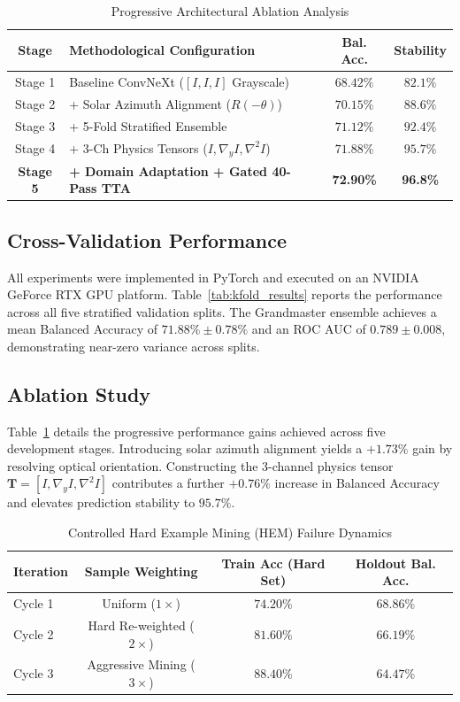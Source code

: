 \documentclass[10pt,journal,compsoc]{IEEEtran}
\theoremstyle{definition}
\begin{document}
\begin{table}[t]
\centering
\caption{Progressive Architectural Ablation Analysis}
\label{tab:ablation}
\begin{tabular}{clcc}
\toprule
\textbf{Stage} & \textbf{Methodological Configuration} & \textbf{Bal. Acc.} & \textbf{Stability} \\
\midrule
Stage 1 & Baseline ConvNeXt ($[I,I,I]$ Grayscale) & $68.42\%$ & $82.1\%$ \\
Stage 2 & + Solar Azimuth Alignment ($R(-\theta)$) & $70.15\%$ & $88.6\%$ \\
Stage 3 & + 5-Fold Stratified Ensemble & $71.12\%$ & $92.4\%$ \\
Stage 4 & + 3-Ch Physics Tensors ($I, \nabla_y I, \nabla^2 I$) & $71.88\%$ & $95.7\%$ \\
\textbf{Stage 5} & \textbf{+ Domain Adaptation + Gated 40-Pass TTA} & \textbf{72.90\%} & \textbf{96.8\%} \\
\bottomrule
\end{tabular}
\end{table}

\subsection{Cross-Validation Performance}
All experiments were implemented in PyTorch and executed on an NVIDIA GeForce RTX GPU platform. Table~\ref{tab:kfold_results} reports the performance across all five stratified validation splits. The Grandmaster ensemble achieves a mean Balanced Accuracy of $71.88\% \pm 0.78\%$ and an ROC AUC of $0.789 \pm 0.008$, demonstrating near-zero variance across splits.

\subsection{Ablation Study}
Table~\ref{tab:ablation} details the progressive performance gains achieved across five development stages. Introducing solar azimuth alignment yields a $+1.73\%$ gain by resolving optical orientation. Constructing the 3-channel physics tensor $\mathbf{T} = [I, \nabla_y I, \nabla^2 I]$ contributes a further $+0.76\%$ increase in Balanced Accuracy and elevates prediction stability to $95.7\%$.

\begin{table}[t]
\centering
\caption{Controlled Hard Example Mining (HEM) Failure Dynamics}
\label{tab:hem_study}
\begin{tabular}{lccc}
\toprule
\textbf{Iteration} & \textbf{Sample Weighting} & \textbf{Train Acc (Hard Set)} & \textbf{Holdout Bal. Acc.} \\
\midrule
Cycle 1 & Uniform ($1\times$) & $74.20\%$ & $\mathbf{68.86\%}$ \\
Cycle 2 & Hard Re-weighted ($2\times$) & $81.60\%$ & $66.19\%$ \\
Cycle 3 & Aggressive Mining ($3\times$) & $88.40\%$ & $64.47\%$ \\
\bottomrule
\end{tabular}
\end{table}
\end{document}
